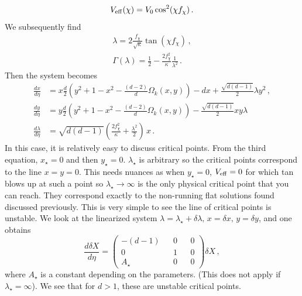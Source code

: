 \documentclass[a4paper]{article}
\begin{document}
\begin{equation}
  V_{\rm eff}(\chi) = V_0\cos^2(\chi f_\chi)\,.
\end{equation}
We subsequently find
\begin{equation}
  \begin{aligned}
    \lambda = 2 \frac{f_\chi}{\sqrt{\kappa}}\tan(\chi f_\chi)\,,\\
    \Gamma(\lambda) = \frac{1}{2}-\frac{2f_\chi^2}{\kappa}\frac{1}{\lambda^2}\,.
  \end{aligned}
\end{equation}
Then the system becomes
\begin{equation}\label{eq:thirdorderautonomousystem}
  \begin{aligned}
    \frac{dx}{d\eta}&=x \frac{d}{2}\left(y^2+1-x^2-\frac{(d-2)}{d}\Omega_k(x,y)\right)-dx+\frac{\sqrt{d(d-1)}}{2}\lambda y^2\,,\\
    \frac{dy}{d\eta} &=y\frac{d}{2}\left(y^2+1-x^2-\frac{(d-2)}{d}\Omega_k(x,y)\right)-\frac{\sqrt{d(d-1)}}{2} x y \lambda\,\\
    \frac{d\lambda}{d\eta}  &= \sqrt{d(d-1)}\left(\frac{2f_\chi^2}{\kappa}+\frac{\lambda^2}{2}\right)\,x\,.
  \end{aligned}
\end{equation}
In this case, it is relatively easy to discuss critical points. From the third equation, $x_\star = 0$ and then $y_\star =0$. $\lambda_\star$ is arbitrary so the critical points correspond to the line $x=y=0$. This needs nuances as when $y_\star=0$, $V_{\rm eff} =0$ for which tan blows up at such a point so $\lambda_\star \to \infty$ is the only physical critical point that you can reach. They correspond exactly to the non-running flat solutions found discussed previously. This is very simple to see the line of critical points is unstable. We look at the linearized system $\lambda = \lambda_\star +\delta \lambda,\, x = \delta x,\, y =\delta y$, and one obtains
\begin{equation}
  \frac{d\delta X}{d\eta} = \begin{pmatrix}
    -(d-1) && 0 && 0 \\
    0 && 1 && 0 \\
    A_\star && 0 && 0 
  \end{pmatrix} \delta X \,,
\end{equation}
where $A_{\star}$ is a constant depending on the parameters. (This does not apply if $\lambda_\star=\infty$). We see that for $d>1$, these are unstable critical points.\\
\end{document}
